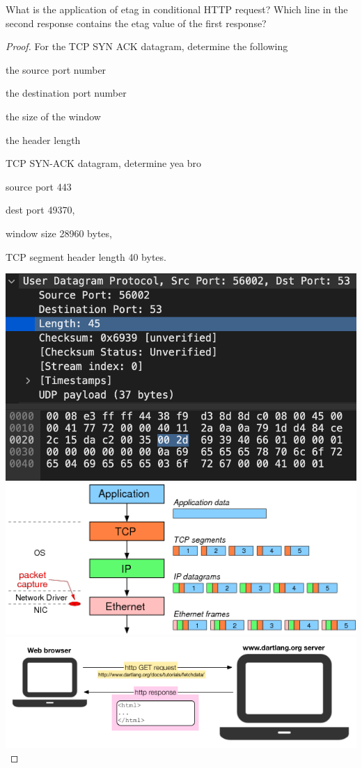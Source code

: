 \documentclass[../../main.tex]{subfiles}
\begin{document}
\begin{wts}
What is the application of etag in conditional HTTP request? Which line in the second response contains the etag value of the first response?
\end{wts}
\begin{proof}
For the TCP SYN ACK datagram, determine the following
	\begin{enumalpha}
		\item the source port number
		\item the destination port number
		\item the size of the window
		\item the header length
	\end{enumalpha}

TCP SYN-ACK datagram, determine yea bro
\begin{enumalpha}
    \item source port 443 
	\item dest port 49370,
	\item window size 28960 bytes,
	\item TCP segment header length 40 bytes.
\end{enumalpha}
\includegraphics[width=\textwidth]{subfiles/images/ECSE_308_Lab_5_1_SUPA_PAGE7_22_Image61.png}
\includegraphics[width=\textwidth]{subfiles/images/L5_Manual/L5N2_ DNS & HTTP_PAGE24_13_Image153.png
}
\includegraphics[width=\textwidth]{subfiles/images/L5_Manual/L5N2_ DNS & HTTP_PAGE21_12_Image137.png}



\end{proof}
\end{document}
